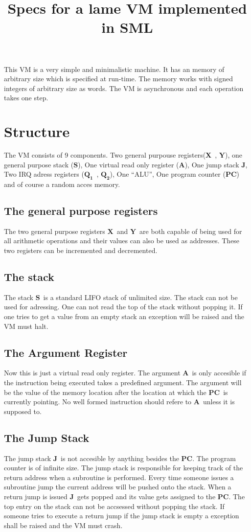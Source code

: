 \documentclass{article}
\title{Specs for a lame VM implemented in SML}
\newcommand{\x}{$\textbf{X}$}
\newcommand{\y}{$\textbf{Y}$}
\newcommand{\s}{$\textbf{S}$}
\newcommand{\A}{$\textbf{A}$}
\newcommand{\q}{$\textbf{Q}_{\textbf{1}}$}
\newcommand{\qq}{$\textbf{Q}_{\textbf{2}}$}
\newcommand{\pc}{$\textbf{PC}$}
\newcommand{\J}{$\textbf{J}$}
\begin{document}
\maketitle
This VM is a very simple and minimalistic machine. It has an memory of
arbitrary size which is specified at run-time. The memory works with signed
integers of arbitrary size as words. The VM is asynchronous and each operation
takes one step.
\section{Structure}
The VM consists of 9 components. Two general purpouse registers(\x \ , \y ), one
general purpose stack (\s), One virtual read only register (\A), One jump stack
\J, Two IRQ adress registers (\q \ , \qq), One ``ALU'', One program counter
(\pc) and of course a random acces memory.

\subsection{The general purpose registers}
The two general purpose registers \x \ and \y \ are both capable of being used
for all arithmetic operations and their values can also be used as addresses.
These two registers can be incremented and decremented.

\subsection{The stack}
The stack \s \ is a standard LIFO stack of unlimited size. The stack can not be
used for adressing. One can not read the top of the stack without popping it. If
one tries to get a value from an empty stack an exception will be raised and the
VM must halt.

\subsection{The Argument Register}
Now this is just a virtual read only register. The argument \A \  is only
accesible if the instruction being executed takes a predefined argument. The
argument will be the value of the memory location after the location at which
the \pc \  is currently pointing. No well formed instruction should refere to
\A \ unless it is supposed to.

\subsection{The Jump Stack}
The jump stack \J \ is not accesible by anything besides the \pc. The program
counter is of infinite size. The jump stack is responsible for keeping track
of the return address when a subroutine is performed. Every time someone
issues a subroutine jump the current address will be pushed onto the stack.
When a return jump is issued \J \ gets popped and its value gets assigned to
the \pc. The top entry on the stack can not be accsessed without popping the
stack.
If someone tries to execute a return jump if the jump stack is empty a exception 
shall be raised and the VM must crash.
\end{document}
